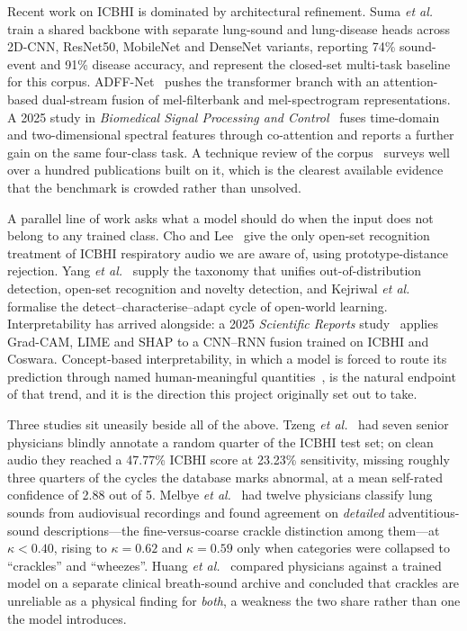\documentclass[journal,onecolumn]{IEEEtran}
\begin{document}
Recent work on ICBHI is dominated by architectural refinement. Suma
\emph{et al.}~\cite{suma2025mtl} train a shared backbone with separate lung-sound and
lung-disease heads across 2D-CNN, ResNet50, MobileNet and DenseNet variants,
reporting 74\% sound-event and 91\% disease accuracy, and represent the closed-set
multi-task baseline for this corpus. ADFF-Net~\cite{adffnet2025} pushes the
transformer branch with an attention-based dual-stream fusion of mel-filterbank and
mel-spectrogram representations. A 2025 study in \emph{Biomedical Signal Processing
and Control}~\cite{bspc2025fusion} fuses time-domain and two-dimensional spectral
features through co-attention and reports a further gain on the same four-class task.
A technique review of the corpus~\cite{electronics2025review} surveys well over a
hundred publications built on it, which is the clearest available evidence that the
benchmark is crowded rather than unsolved.

A parallel line of work asks what a model should do when the input does not belong to
any trained class. Cho and Lee~\cite{cho2025openset} give the only open-set
recognition treatment of ICBHI respiratory audio we are aware of, using
prototype-distance rejection. Yang \emph{et al.}~\cite{yang2024ood} supply the
taxonomy that unifies out-of-distribution detection, open-set recognition and novelty
detection, and Kejriwal \emph{et al.}~\cite{kejriwal2024owl} formalise the
detect--characterise--adapt cycle of open-world learning. Interpretability has
arrived alongside: a 2025 \emph{Scientific Reports} study~\cite{scirep2025cnnrnn}
applies Grad-CAM, LIME and SHAP to a CNN--RNN fusion trained on ICBHI and Coswara.
Concept-based interpretability, in which a model is forced to route its prediction
through named human-meaningful quantities~\cite{koh2020cbm}, is the natural endpoint
of that trend, and it is the direction this project originally set out to take.

Three studies sit uneasily beside all of the above. Tzeng
\emph{et al.}~\cite{tzeng2025jmir} had seven senior physicians blindly annotate a
random quarter of the ICBHI test set; on clean audio they reached a 47.77\% ICBHI
score at 23.23\% sensitivity, missing roughly three quarters of the cycles the
database marks abnormal, at a mean self-rated confidence of 2.88 out of 5.
Melbye \emph{et al.}~\cite{melbye2016kappa} had twelve physicians classify lung
sounds from audiovisual recordings and found agreement on \emph{detailed}
adventitious-sound descriptions---the fine-versus-coarse crackle distinction among
them---at $\kappa < 0.40$, rising to $\kappa = 0.62$ and $\kappa = 0.59$ only when
categories were collapsed to ``crackles'' and ``wheezes''. Huang
\emph{et al.}~\cite{huang2024crackles} compared physicians against a trained model on a
separate clinical breath-sound archive and concluded that crackles are unreliable as a
physical finding for \emph{both}, a weakness the two share rather than one the model
introduces.
\end{document}
